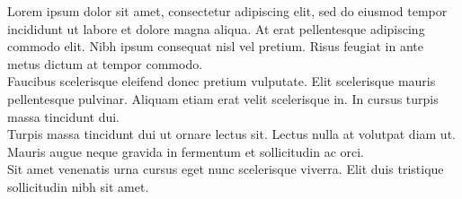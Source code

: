 \thispagestyle{empty}

\vfill

Lorem ipsum dolor sit amet, consectetur adipiscing elit, sed do eiusmod tempor incididunt ut labore et dolore magna aliqua. At erat pellentesque adipiscing commodo elit. Nibh ipsum consequat nisl vel pretium. Risus feugiat in ante metus dictum at tempor commodo.\\

Faucibus scelerisque eleifend donec pretium vulputate. Elit scelerisque mauris pellentesque pulvinar. Aliquam etiam erat velit scelerisque in. In cursus turpis massa tincidunt dui.\\

Turpis massa tincidunt dui ut ornare lectus sit. Lectus nulla at volutpat diam ut. Mauris augue neque gravida in fermentum et sollicitudin ac orci.\\

Sit amet venenatis urna cursus eget nunc scelerisque viverra. Elit duis tristique sollicitudin nibh sit amet.
\vfill